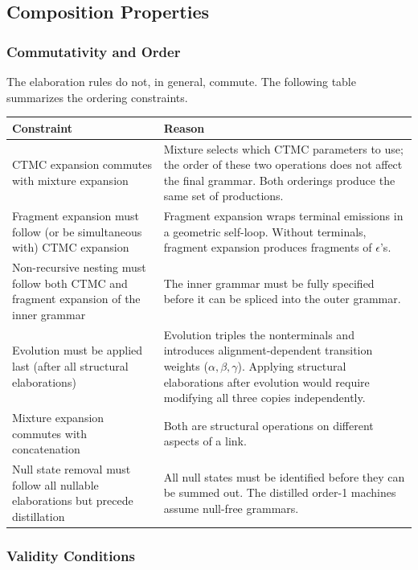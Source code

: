 \subsection{Composition Properties}

\subsubsection{Commutativity and Order}

The elaboration rules do not, in general, commute.
The following table summarizes the ordering constraints.

\begin{center}
\begin{tabular}{p{4cm}p{8cm}}
\toprule
\textbf{Constraint} & \textbf{Reason} \\
\midrule
CTMC expansion commutes with mixture expansion &
Mixture selects which CTMC parameters to use;
the order of these two operations does not affect the final grammar.
Both orderings produce the same set of productions. \\[6pt]
Fragment expansion must follow (or be simultaneous with) CTMC expansion &
Fragment expansion wraps terminal emissions in a geometric self-loop.
Without terminals, fragment expansion produces fragments of $\epsilon$'s. \\[6pt]
Non-recursive nesting must follow both CTMC and fragment expansion of the inner grammar &
The inner grammar must be fully specified before it can be spliced
into the outer grammar. \\[6pt]
Evolution must be applied last (after all structural elaborations) &
Evolution triples the nonterminals and introduces
alignment-dependent transition weights ($\alpha, \beta, \gamma$).
Applying structural elaborations after evolution would require
modifying all three copies independently. \\[6pt]
Mixture expansion commutes with concatenation &
Both are structural operations on different aspects of a link. \\[6pt]
Null state removal must follow all nullable elaborations but precede distillation &
All null states must be identified before they can be summed out.
The distilled order-1 machines assume null-free grammars. \\
\bottomrule
\end{tabular}
\end{center}

\subsubsection{Validity Conditions}

